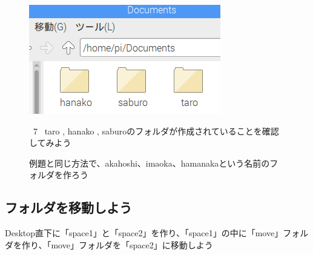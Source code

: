 \documentclass[a4paper,12pt]{jarticle}
\begin{document}
\begin{figure}
  \centering
  \includegraphics[width=8.359cm,height=4.761cm]{textbook-img043.png}
  \begin{minipage}{\textwidth}
    \ 7 \ taro , hanako ,
    saburoのフォルダが作成されていることを確認してみよう
  \end{minipage}
  \vspace{10mm}
  \flushleft
  \theQuestion\label{Q:hasAnswer02-1}

  例題と同じ方法で、akahoshi、imaoka、hamanakaという名前のフォルダを作ろう

\end{figure}
\clearpage
{}
\subsection{\theExercise フォルダを移動しよう}
Desktop直下に「space1」と「space2」を作り、「space1」の中に「move」フォルダを作り、「move」フォルダを「space2」に移動しよう

\end{document}
